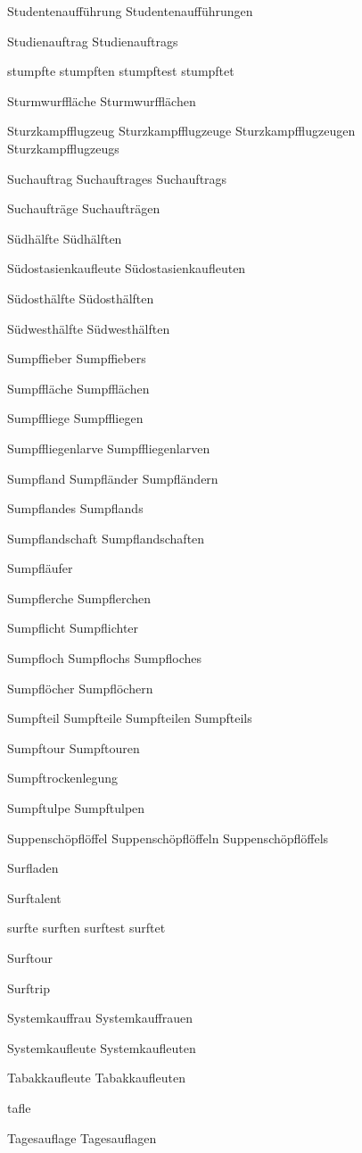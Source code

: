 Studentenaufführung
Studentenaufführungen

Studienauftrag
Studienauftrags

stumpfte
stumpften
stumpftest
stumpftet

Sturmwurffläche
Sturmwurfflächen

Sturzkampfflugzeug
Sturzkampfflugzeuge
Sturzkampfflugzeugen
Sturzkampfflugzeugs

Suchauftrag
Suchauftrages
Suchauftrags

Suchaufträge
Suchaufträgen

Südhälfte
Südhälften

Südostasienkaufleute
Südostasienkaufleuten

Südosthälfte
Südosthälften

Südwesthälfte
Südwesthälften

Sumpffieber
Sumpffiebers

Sumpffläche
Sumpfflächen

Sumpffliege 
Sumpffliegen

Sumpffliegenlarve
Sumpffliegenlarven

Sumpfland
Sumpfländer
Sumpfländern

Sumpflandes
Sumpflands

Sumpflandschaft
Sumpflandschaften

Sumpfläufer

Sumpflerche
Sumpflerchen

Sumpflicht
Sumpflichter

Sumpfloch
Sumpflochs
Sumpfloches

Sumpflöcher
Sumpflöchern

Sumpfteil
Sumpfteile
Sumpfteilen
Sumpfteils

Sumpftour
Sumpftouren

Sumpftrockenlegung

Sumpftulpe
Sumpftulpen

Suppenschöpflöffel
Suppenschöpflöffeln
Suppenschöpflöffels

Surfladen

Surftalent

surfte
surften
surftest
surftet

Surftour

Surftrip

Systemkauffrau
Systemkauffrauen

Systemkaufleute
Systemkaufleuten

Tabakkaufleute
Tabakkaufleuten

tafle

Tagesauflage
Tagesauflagen

